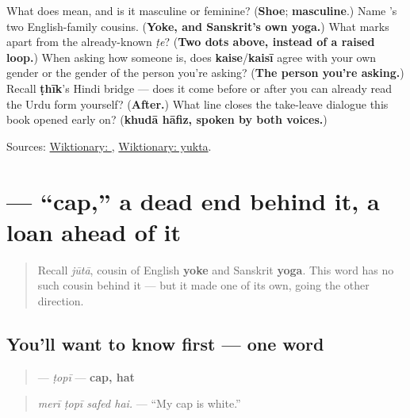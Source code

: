 \begin{tcolorbox}[breakable,colback=teal!4,colframe=teal!35!black,title={Before you move on}]
What does \textbf{} mean, and is it masculine or feminine? (\textbf{Shoe}; \textbf{masculine}.) Name \textbf{}'s two English-family cousins. (\textbf{Yoke, and Sanskrit's own yoga.}) What marks \textbf{} apart from the already-known \emph{ṭe}? (\textbf{Two dots above, instead of a raised loop.}) When asking how someone is, does \textbf{kaise}/\textbf{kaisī} agree with your own gender or the gender of the person you're asking? (\textbf{The person you're asking.}) Recall \textbf{ṭhīk}'s Hindi bridge — does it come before or after you can already read the Urdu form yourself? (\textbf{After.}) What line closes the take-leave dialogue this book opened early on? (\textbf{khudā hāfiz, spoken by both voices.})

Sources: \href{https://en.wiktionary.org/wiki/\%D8\%AC\%D9\%88\%D8\%AA\%D8\%A7}{Wiktionary: }, \href{https://en.wiktionary.org/wiki/\%E0\%A4\%AF\%E0\%A5\%81\%E0\%A4\%95\%E0\%A5\%8D\%E0\%A4\%A4}{Wiktionary: yukta}.
\end{tcolorbox}
\section[\texorpdfstring{\ur{ٹوپی} (ṭopī)}{ٹوپی (ṭopī)}]{ — \textquotedblleft{}cap,\textquotedblright{} a dead end behind it, a loan ahead of it}

\label{lesson:UR-C14-topi}



\begin{quote}
Recall \emph{jūtā}, cousin of English \textbf{yoke} and Sanskrit \textbf{yoga}. This word has no such cousin behind it — but it made one of its own, going the other direction.
\end{quote}

\subsection*{You'll want to know first — one word}
\begin{quote}
\textbf{} — \emph{ṭopī} — \textbf{cap, hat}
\end{quote}

\begin{quote}
\emph{merī ṭopī safed hai.} — \textquotedblleft{}My cap is white.\textquotedblright{}
\end{quote}

